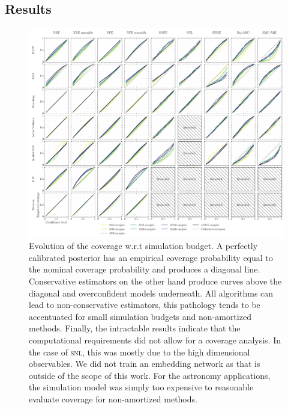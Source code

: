 \documentclass[twoside]{article}
\begin{document}
\subsection{Results}
\begin{figure}[h!]
    \includegraphics[width=\textwidth]{figures/coverage_multi.pdf}
    \caption{Evolution of the coverage w.r.t simulation budget. A perfectly calibrated posterior has an empirical coverage probability equal to the nominal coverage probability and produces a diagonal line. Conservative estimators on the other hand produce curves above the diagonal and overconfident models underneath. All algorithms can lead to non-conservative estimators, this pathology tends to be accentuated for small simulation budgets and non-amortized methods.
    Finally, the intractable results indicate that the computational requirements did not allow for a coverage analysis. In the case of \textsc{snl}, this was mostly due to the high dimensional observables. We did not train an embedding network as that is outside of the scope of this work. For the astronomy applications, the simulation model was simply too expensive to reasonable evaluate coverage for non-amortized methods.
    }
    \label{fig:all_coverage_levels}
\end{figure}
\end{document}
